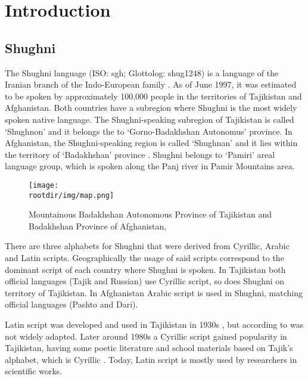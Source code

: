 \section{Introduction}

\subsection{Shughni}
The Shughni language (ISO: sgh; Glottolog: shug1248) is a language of the Iranian branch of the Indo-European family \parencite[12]{plungian_study_2022}. As of June 1997, it was estimated to be spoken by approximately 100,000 people \parencite[225]{edelman_languages_1999} in the territories of Tajikistan and Afghanistan. Both countries have a subregion where Shughni is the most widely spoken native language. The Shughni-speaking subregion of Tajikistan is called `Shughnon' and it belongs the to `Gorno-Badakhshan Autonomus' province. In Afghanistan, the Shughni-speaking region is called `Shughnan' and it lies within the territory of `Badakhshan' province \parencite[2]{parker_shughni_2023}. Shughni belongs to `Pamiri' areal language group, which is spoken along the Panj river in Pamir Mountains area.
\begin{figure}[h]
    \centering
    \texttt{[image: \\rootdir/img/map.png]}
    \caption{Mountainous Badakhshan Autonomous Province of Tajikistan and Badakhshan Province of Afghanistan, \parencite[Fig 1.1]{parker_shughni_2023}}
    \label{fig:map1}
\end{figure}

There are three alphabets for Shughni that were derived from Cyrillic, Arabic and Latin scripts. Geographically the usage of said scripts correspond to the dominant script of each country where Shughni is spoken. In Tajikistan both official languages (Tajik and Russian) use Cyrillic script, so does Shughni on territory of Tajikistan. In Afghanistan Arabic script is used in Shughni, matching official languages (Pashto and Dari). 

Latin script was developed and used in Tajikistan in 1930s \parencite[226]{edelman_languages_1999} \parencite[788]{edelman_dodykhudoeva_shughni_2009}, but according to \textcite{edelman_languages_1999} was not widely adapted. Later around 1980s a Cyrillic script gained popularity in Tajikistan, having some poetic literature and school materials based on Tajik's alphabet, which is Cyrillic \parencite{edelman_languages_1999}. Today, Latin script is mostly used by researchers in scientific works.

